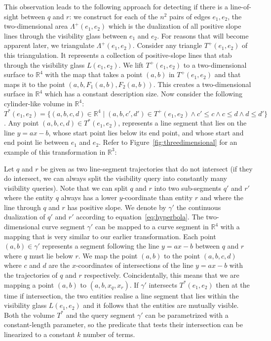 \documentclass[UKenglish]{lipics-v2019}
\begin{document}
This observation leads to the following approach for detecting if there is a line-of-sight between $q$ and $r$: we construct for each of the $n^2$ pairs of edges $e_1, e_2$, the two-dimensional area $\Lambda ^+(e_1, e_2)$ which is the dualization of all positive slope lines through the visibility glass between $e_1$ and $e_2$. For reasons that will become apparent later, we triangulate $\Lambda ^+(e_1,e_2)$. Consider any triangle $T^+(e_1, e_2)$ of this triangulation. It represents a collection of positive-slope lines that stab through the visibility glass $L(e_1, e_2)$. We lift $T^+(e_1, e_2)$ to a two-dimensional surface to $\mathbb{R}^4$ with the map that takes a point $(a, b)$ in $T^+(e_1, e_2)$ and that maps it to the point $(a,b, F_1(a,b), F_2(a,b))$. 
This creates a two-dimensional surface in $\mathbb{R}^4$ which has a constant description size. Now consider the following cylinder-like volume in $\mathbb{R}^4$: $T^*(e_1, e_2) = \{ (a,b,c,d) \in \mathbb{R}^4 \mid (a,b,c',d') \in T^+(e_1, e_2) \wedge c' \le c \wedge c \le d \wedge d \le d'  \}$. Any point $(a,b,c,d) \in T^*(e_1, e_2)$, represents a line segment that lies on the line $y = ax-b$, whose start point lies below its end point, and whose start and end point lie between $e_1$ and $e_2$. 
Refer to Figure~\ref{fig:threedimensional} for an example of this transformation in $\mathbb{R}^3$:

Let $q$ and $r$ be given as two line-segment trajectories that do not intersect (if they do intersect, we can always split the visibility query into constantly many visibility queries). Note that we can split $q$ and $r$ into two sub-segments $q'$ and $r'$ where the entity $q$ always has a lower $y$-coordinate than entity $r$ and where the line through $q$ and $r$ has positive slope. We denote by $\gamma'$ the continuous dualization of $q'$ and $r'$ according to equation~\ref{eq:hyperbola}. The two-dimensional curve segment $\gamma'$ can be mapped to a curve segment in $\mathbb{R}^4$ with a mapping that is very similar to our earlier transformation. Each point $(a,b) \in \gamma'$ represents a segment following the line $y = ax - b$ between $q$ and $r$ where $q$ must lie below $r$. We map the point $(a,b)$ to the point $(a,b,c,d)$ where $c$ and $d$ are the $x$-coordinates of intersections of the line $y= ax -b$ with the trajectories of $q$ and $r$ respectively. Coincidentally, this means that we are mapping a point $(a,b)$ to $(a,b, x_{q}, x_{r})$.
If $\gamma'$ intersects $T^*(e_1, e_2)$ then at the time if intersection, the two entities realise a line segment that lies within the visibility glass $L(e_1, e_2)$ and it follows that the entities are mutually visible. Both the volume $T^*$ and the query segment $\gamma'$ can be parametrized with a constant-length parameter, so the predicate that tests their intersection can be linearized to a constant $k$ number of terms.
\end{document}
